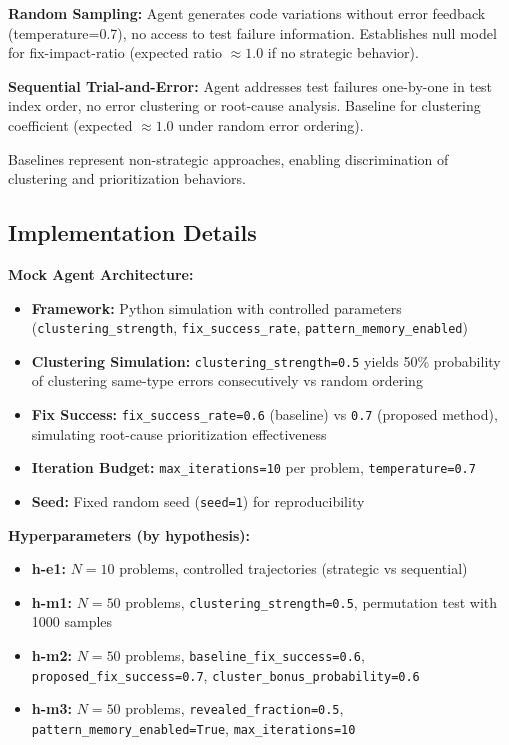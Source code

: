 \textbf{Random Sampling:} Agent generates code variations without error feedback (temperature=0.7), no access to test failure information. Establishes null model for fix-impact-ratio (expected ratio $\approx 1.0$ if no strategic behavior).

\textbf{Sequential Trial-and-Error:} Agent addresses test failures one-by-one in test index order, no error clustering or root-cause analysis. Baseline for clustering coefficient (expected $\approx 1.0$ under random error ordering).

Baselines represent non-strategic approaches, enabling discrimination of clustering and prioritization behaviors.

\subsection{Implementation Details}

\textbf{Mock Agent Architecture:}
\begin{itemize}
    \item \textbf{Framework:} Python simulation with controlled parameters (\texttt{clustering\_strength}, \texttt{fix\_success\_rate}, \texttt{pattern\_memory\_enabled})
    \item \textbf{Clustering Simulation:} \texttt{clustering\_strength=0.5} yields 50\% probability of clustering same-type errors consecutively vs random ordering
    \item \textbf{Fix Success:} \texttt{fix\_success\_rate=0.6} (baseline) vs \texttt{0.7} (proposed method), simulating root-cause prioritization effectiveness
    \item \textbf{Iteration Budget:} \texttt{max\_iterations=10} per problem, \texttt{temperature=0.7}
    \item \textbf{Seed:} Fixed random seed (\texttt{seed=1}) for reproducibility
\end{itemize}

\textbf{Hyperparameters (by hypothesis):}
\begin{itemize}
    \item \textbf{h-e1:} $N=10$ problems, controlled trajectories (strategic vs sequential)
    \item \textbf{h-m1:} $N=50$ problems, \texttt{clustering\_strength=0.5}, permutation test with 1000 samples
    \item \textbf{h-m2:} $N=50$ problems, \texttt{baseline\_fix\_success=0.6}, \texttt{proposed\_fix\_success=0.7}, \texttt{cluster\_bonus\_probability=0.6}
    \item \textbf{h-m3:} $N=50$ problems, \texttt{revealed\_fraction=0.5}, \texttt{pattern\_memory\_enabled=True}, \texttt{max\_iterations=10}
\end{itemize}


